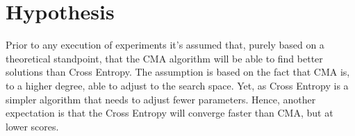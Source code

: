 \section{Hypothesis}

Prior to any execution of experiments it's assumed that, purely based 
on a theoretical standpoint, that the CMA algorithm will be able to 
find better solutions than Cross Entropy. The assumption is based 
on the fact that CMA is, to a higher degree, able to adjust to the 
search space. Yet, as Cross Entropy is a simpler algorithm that needs 
to adjust fewer parameters. Hence, another expectation is that the 
Cross Entropy will converge faster than CMA, but at lower scores.
